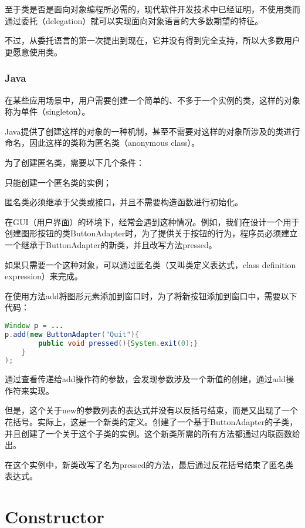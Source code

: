 至于类是否是面向对象编程所必需的，现代软件开发技术中已经证明，不使用类而通过委托（delegation）就可以实现面向对象语言的大多数期望的特征。

不过，从委托语言的第一次提出到现在，它并没有得到完全支持，所以大多数用户更愿意使用类。


\subsection{Java}

在某些应用场景中，用户需要创建一个简单的、不多于一个实例的类，这样的对象称为单件（singleton）。


Java提供了创建这样的对象的一种机制，甚至不需要对这样的对象所涉及的类进行命名，因此这样的类称为匿名类（anonymous class）。

为了创建匿名类，需要以下几个条件：

\begin{compactenum}
\item 只能创建一个匿名类的实例；
\item 匿名类必须继承于父类或接口，并且不需要构造函数进行初始化。
\end{compactenum}

在GUI（用户界面）的环境下，经常会遇到这种情况。例如，我们在设计一个用于创建图形按钮的类ButtonAdapter时，为了提供关于按钮的行为，程序员必须建立一个继承于ButtonAdapter的新类，并且改写方法pressed。

如果只需要一个这种对象，可以通过匿名类（又叫类定义表达式，class definition expression）来完成。

在使用方法add将图形元素添加到窗口时，为了将新按钮添加到窗口中，需要以下代码：


\begin{lstlisting}[language=Java]
Window p = ...
p.add(new ButtonAdapter("Quit"){
		public void pressed(){System.exit(0);}
	}
);
\end{lstlisting}

通过查看传递给add操作符的参数，会发现参数涉及一个新值的创建，通过add操作符来实现。

但是，这个关于new的参数列表的表达式并没有以反括号结束，而是又出现了一个花括号。实际上，这是一个新类的定义。创建了一个基于ButtonAdapter的子类，并且创建了一个关于这个子类的实例。这个新类所需的所有方法都通过内联函数给出。

在这个实例中，新类改写了名为pressed的方法，最后通过反花括号结束了匿名类表达式。


\chapter{Constructor}


